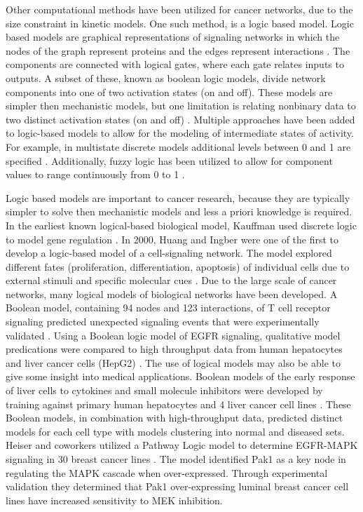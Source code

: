 \documentclass[12pt]{article}
\begin{document}
Other computational methods have been utilized for cancer networks, due to the size constraint in kinetic models. One such method, is a logic based model. Logic based models are graphical representations of signaling networks in which the nodes of the graph represent proteins and the edges represent interactions \cite{Morris2010}. The components are connected with logical gates, where each gate relates inputs to outputs. A subset of these, known as boolean logic models, divide network components into one of two activation states (on and off). These models are simpler then mechanistic models, but one limitation is relating nonbinary data to two distinct activation states (on and off) \cite{Kholodenko2012}. Multiple approaches have been added to logic-based models to allow for the modeling of intermediate states of activity. For example, in multistate discrete models additional levels between 0 and 1 are specified \cite{Morris2010}. Additionally, fuzzy logic has been utilized to allow for component values to range continuously from 0 to 1 \cite{Morris2010}. 

Logic based models are important to cancer research, because they are typically simpler to solve then mechanistic models and less a priori knowledge is required. In the earliest known logical-based biological model, Kauffman used discrete logic to model gene regulation \cite{Kauffman1969}. In 2000, Huang and Ingber were one of the first to develop a logic-based model of a cell-signaling network. The model explored different fates (proliferation, differentiation, apoptosis) of individual cells due to external stimuli and specific molecular cues \cite{Huang2000}. Due to the large scale of cancer networks, many logical models of biological networks have been developed. A Boolean model, containing 94 nodes and 123 interactions, of T cell receptor signaling predicted unexpected signaling events that were experimentally validated \cite{Saez-Rodriguez2007}. Using a Boolean logic model of EGFR signaling, qualitative model predications were compared to high throughput data from human hepatocytes and liver cancer cells (HepG2) \cite{Samaga2009}. The use of logical models may also be able to give some insight into medical applications. Boolean models of the early response of liver cells to cytokines and small molecule inhibitors were developed by training against primary human hepatocytes and 4 liver cancer cell lines \cite{Saez-Rodriguez2009,Saez-Rodriguez2011}. These Boolean models, in combination with high-throughput data, predicted distinct models for each cell type with models clustering into normal and diseased sets. Heiser and coworkers utilized a Pathway Logic model to determine EGFR-MAPK signaling in 30 breast cancer lines \cite{Heiser2009}. The model identified Pak1 as a key node in regulating the MAPK cascade when over-expressed. Through experimental validation they determined that Pak1 over-expressing luminal breast cancer cell lines have increased sensitivity to MEK inhibition.  
\end{document}

